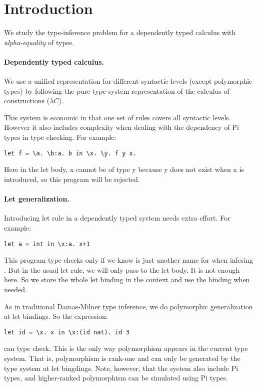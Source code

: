 \section{Introduction}
We study the type-inference problem for a dependently
typed calculus with \emph{alpha-equality} of types.

\paragraph{Dependently typed calculus.} We use a unified
representation for different syntactic levels (except polymorphic
types) by following the pure type system representation of the
calculus of constructions ($\lambda C$).

This system is economic in that one set of rules covers all syntactic
levels. However it also includes complexity when dealing with the
dependency of Pi types in type checking. For example:

\begin{lstlisting}
let f = \a. \b:a. b in \x. \y. f y x.
\end{lstlisting}

Here in the let body, \lst x cannot be of type \lst y because \lst y
does not exist when \lst x is introduced, so this program will be
rejected.

\paragraph{Let generalization.} Introducing let rule in a dependently
typed system needs extra effort. For example:

\begin{lstlisting}
let a = int in \x:a. x+1
\end{lstlisting}

This program type checks only if we know  is just another
name for  when infering . But in the usual let rule, we will
only pass  to the let body. It is not enough here. So we 
store the whole let binding  in the context and use the
binding when needed.

As in traditional Damas-Milner type inference, we do
polymorphic generalization at let bindings. So the expression:

\begin{lstlisting}
let id = \x. x in \x:(id nat). id 3
\end{lstlisting}

can type check. This is the only way polymorphism 
appears in the current type system. That is, polymorphism is rank-one
and can only be generated by the type system at let bingdings.
Note, however, that the system also include Pi types, and
higher-ranked polymorphism can be simulated using Pi types. 


